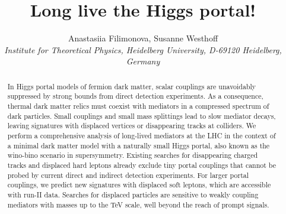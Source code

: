 \documentclass[nofootinbib,prd,aps,superscriptaddress,preprintnumbers]{revtex4}
\begin{document}
\begin{flushright}

\end{flushright}

\title{Long live the Higgs portal!}

\author{Anastasiia Filimonova, Susanne Westhoff\\
\textit{ \small{Institute for Theoretical Physics, Heidelberg University, D-69120 Heidelberg, Germany} }}

\vspace{1.0cm}
\begin{abstract}
\vspace{0.2cm}\noindent
In Higgs portal models of fermion dark matter, scalar couplings are unavoidably suppressed by strong bounds from direct detection experiments. As a consequence, thermal dark matter relics must coexist with mediators in a compressed spectrum of dark particles. Small couplings and small mass splittings lead to slow mediator decays, leaving signatures with displaced vertices or disappearing tracks at colliders. We perform a comprehensive analysis of long-lived mediators at the LHC in the context of a minimal dark matter model with a naturally small Higgs portal, also known as the wino-bino scenario in supersymmetry. Existing searches for disappearing charged tracks and displaced hard leptons already exclude tiny portal couplings that cannot be probed by current direct and indirect detection experiments. For larger portal couplings, we predict new signatures with displaced soft leptons, which are accessible with run-II data. Searches for displaced particles are sensitive to weakly coupling mediators with masses up to the TeV scale, well beyond the reach of prompt signals.
\end{abstract}
\maketitle
\tableofcontents
\end{document}
